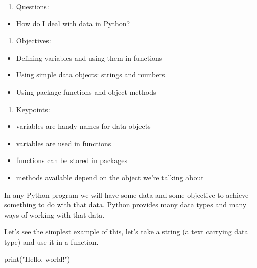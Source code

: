 \documentclass[]{book}
\newenvironment{Shaded}{\begin{snugshade}}{\end{snugshade}}
\newcommand{\BuiltInTok}[1]{#1}
\newcommand{\NormalTok}[1]{#1}
\newcommand{\StringTok}[1]{\textcolor[rgb]{0.31,0.60,0.02}{#1}}
\providecommand{\tightlist}{%
  \setlength{\itemsep}{0pt}\setlength{\parskip}{0pt}}
\theoremstyle{definition}
\theoremstyle{definition}
\theoremstyle{definition}
\theoremstyle{remark}
\begin{document}
\begin{enumerate}
\def\labelenumi{\arabic{enumi}.}
\tightlist
\item
  Questions:
\end{enumerate}

\begin{itemize}
\tightlist
\item
  How do I deal with data in Python?
\end{itemize}

\begin{enumerate}
\def\labelenumi{\arabic{enumi}.}
\setcounter{enumi}{1}
\tightlist
\item
  Objectives:
\end{enumerate}

\begin{itemize}
\tightlist
\item
  Defining variables and using them in functions
\item
  Using simple data objects: strings and numbers
\item
  Using package functions and object methods
\end{itemize}

\begin{enumerate}
\def\labelenumi{\arabic{enumi}.}
\setcounter{enumi}{2}
\tightlist
\item
  Keypoints:
\end{enumerate}

\begin{itemize}
\tightlist
\item
  variables are handy names for data objects
\item
  variables are used in functions
\item
  functions can be stored in packages
\item
  methods available depend on the object we're talking about
\end{itemize}

In any Python program we will have some data and some objective to
achieve - something to do with that data. Python provides many data
types and many ways of working with that data.

Let's see the simplest example of this, let's take a string (a text
carrying data type) and use it in a function.

\begin{Shaded}
\begin{Highlighting}[]
\BuiltInTok{print}\NormalTok{(}\StringTok{"Hello, world!"}\NormalTok{)}
\end{Highlighting}
\end{Shaded}
\end{document}
